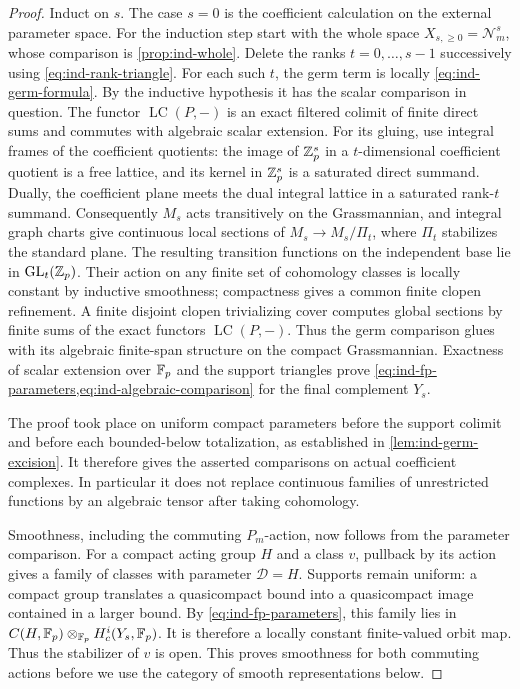 \begin{proof}
Induct on $s$.  The case $s=0$ is the coefficient calculation on
the external parameter space.  For the induction step start
with the whole space $X_{s,\geq0}=\mathcal N_m^s$, whose
comparison is \cref{prop:ind-whole}.  Delete the ranks
$t=0,\ldots,s-1$ successively using
\cref{eq:ind-rank-triangle}.  For each such $t$, the germ term
is locally \cref{eq:ind-germ-formula}.  By the inductive
hypothesis it has the scalar comparison in question.  The
functor $\operatorname{LC}(P,-)$ is an exact filtered colimit
of finite direct sums and commutes with algebraic scalar
extension.  For its gluing, use integral frames of the coefficient
quotients: the image of $\mathbb Z_p^s$ in a $t$-dimensional coefficient
quotient is a free lattice, and its kernel in $\mathbb Z_p^s$ is a
saturated direct summand.  Dually, the coefficient plane meets
the dual integral lattice in a saturated rank-$t$ summand.
Consequently $M_s$ acts transitively on the Grassmannian, and
integral graph charts give continuous local sections of
$M_s\to M_s/\Pi_t$, where $\Pi_t$ stabilizes the standard plane.
The resulting transition functions on the independent base
lie in $\operatorname{GL}_t(\mathbb Z_p)$.  Their action on any finite set of
cohomology classes is locally constant by inductive smoothness;
compactness gives a common finite clopen refinement.  A finite
disjoint clopen trivializing cover computes global sections by
finite sums of the exact functors $\operatorname{LC}(P,-)$.
Thus the germ comparison glues with its algebraic finite-span
structure on the compact Grassmannian.  Exactness of scalar extension
over $\mathbb F_p$ and the support triangles prove
\cref{eq:ind-fp-parameters,eq:ind-algebraic-comparison} for the
final complement $Y_s$.

The proof took place on uniform compact parameters before the
support colimit and before each bounded-below totalization,
as established in \cref{lem:ind-germ-excision}.  It therefore
gives the asserted comparisons on actual coefficient
complexes.  In particular it does not replace continuous
families of unrestricted functions by an algebraic tensor
after taking cohomology.

Smoothness, including the commuting $P_m$-action, now follows
from the parameter comparison.  For a compact acting group
$H$ and a class $v$, pullback by its action gives a family
of classes with parameter $\mathcal D=H$.  Supports remain
uniform: a compact group translates a quasicompact bound
into a quasicompact image contained in a larger bound.
By \cref{eq:ind-fp-parameters}, this family lies in
$C(H,\mathbb F_p)\otimes_{\mathbb F_p}H_c^i(Y_s,\mathbb F_p)$.  It is therefore
a locally constant finite-valued orbit map.  Thus the
stabilizer of $v$ is open.  This proves smoothness for both
commuting actions before we use the category of smooth
representations below.


\end{proof}
